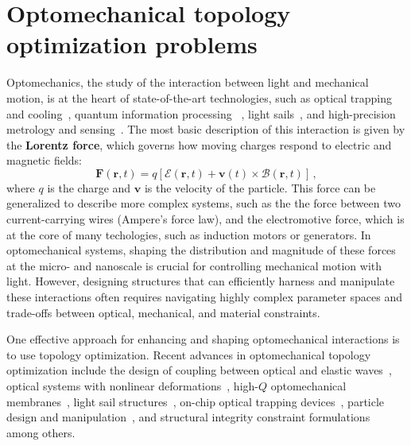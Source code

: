 \chapter{Optomechanical topology optimization problems}\label{chap:om}
Optomechanics, the study of the interaction between light and mechanical motion, is at the heart of state-of-the-art technologies, such as 
optical trapping~\cite{ashkin_acceleration_1970, moffitt_recent_2008} and cooling~\cite{cooling}, quantum information processing~\cite{Andrews_2014, Xi_2025}
, light sails~\cite{lightsail, lightsail1}, and high-precision metrology and sensing~\cite{sensing, weakforce, Li:18, Mason_2019}. The most basic description of this interaction is given by the \textbf{Lorentz force}, which governs how moving charges respond to electric and magnetic fields:
\begin{equation}\label{eq:lorentz_f}
    \mathbf{\mathbf{F}}(\mathbf{r},t) = q \left[ \bm{\mathcal{E}}(\mathbf{r},t) + \mathbf{v}(t) \times \bm{\mathcal{B}}(\mathbf{r},t) \right]\,,
\end{equation}
where $q$ is the charge and $\mathbf{v}$ is the velocity of the particle. This force can be generalized to describe more complex systems,
such as the the force between two current-carrying 
wires (Ampere's force law), and the electromotive force, which is at the core of many techologies, such as induction motors or generators.
In optomechanical systems, shaping the distribution and magnitude of these forces at the micro- and nanoscale is crucial for controlling mechanical motion with light. 
However, designing structures that can efficiently harness and manipulate these interactions often requires navigating highly complex
 parameter spaces and trade-offs between optical, mechanical, and material constraints.

 One effective approach for enhancing and shaping optomechanical interactions is to use topology optimization.
Recent advances in optomechanical topology optimization include the design of coupling between optical and elastic
 waves~\cite{photo_topopt}, optical systems with nonlinear deformations~\cite{def_wg}, high-$Q$ optomechanical membranes~\cite{highQ1, fengwen, aragon1},
light sail structures~\cite{lightsail_topopt, lightsail_topopt1},
on-chip optical trapping devices~\cite{ownpub1}, particle design and manipulation~\cite{ownpub2, particle_opt},
and structural integrity constraint formulations~\cite{structural_integrity}
 among others.

